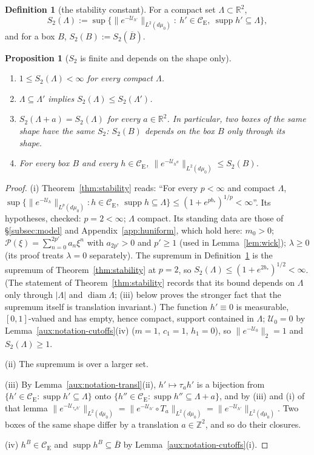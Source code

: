 \documentclass[11pt,a4paper]{article}
\theoremstyle{plain}
\theoremstyle{definition}
\theoremstyle{plain}
\newtheorem{auxprop}[auxlemma]{Proposition}
\theoremstyle{definition}
\newtheorem{auxdef}[auxlemma]{Definition}
\newcommand{\R}{\mathbb{R}}
\newcommand{\Z}{\mathbb{Z}}
\newcommand{\CE}{\mathcal{C}_{\mathrm E}}
\DeclareMathOperator{\supp}{supp}
\newcommand{\Uc}{\mathcal U}
\newcommand{\dmu}{d\mu_0}
\begin{document}
\begin{auxdef}[the stability constant]\label{aux:notation-S2def}
For a compact set $\Lambda\subset\R^2$,
\[
 S_2(\Lambda):=\sup\bigl\{\|e^{-\Uc_{h'}}\|_{L^2(\dmu)}:\ h'\in\CE,\ \supp h'\subseteq\Lambda\bigr\},
\]
and for a box $B$, $S_2(B):=S_2(\overline B)$.
\end{auxdef}

\begin{auxprop}[$S_2$ is finite and depends on the shape only]\label{aux:notation-S2}
\begin{enumerate}
\item[\textup{(i)}] $1\le S_2(\Lambda)<\infty$ for every compact $\Lambda$.
\item[\textup{(ii)}] $\Lambda\subseteq\Lambda'$ implies $S_2(\Lambda)\le S_2(\Lambda')$.
\item[\textup{(iii)}] $S_2(\Lambda+a)=S_2(\Lambda)$ for every $a\in\R^2$.  In particular, two
boxes of the same shape have the same $S_2$: $S_2(B)$ depends on the box $B$ only through its
shape.
\item[\textup{(iv)}] For every box $B$ and every $h\in\CE$,
$\|e^{-\Uc_{h^B}}\|_{L^2(\dmu)}\le S_2(B)$.
\end{enumerate}
\end{auxprop}

\begin{proof}
(i) Theorem~\ref{thm:stability} reads: ``For every $p<\infty$ and compact
$\Lambda$, $\sup\{\|e^{-\mathcal U_h}\|_{L^p(d\mu_0)}:h\in\CE,\ \supp h\subseteq\Lambda\}\le
(1+e^{pb_*})^{1/p}<\infty$''.
Its hypotheses, checked: $p=2<\infty$; $\Lambda$ compact.  Its standing data are those of
\S\ref{subsec:model} and Appendix~\ref{app:huniform}, which hold here: $m_0>0$; $\mathscr
P(\xi)=\sum_{n=0}^{2p'}a_n\xi^n$ with $a_{2p'}>0$ and $p'\ge1$ (used in Lemma~\ref{lem:wick}); $\lambda\ge0$
(its proof treats $\lambda=0$ separately).  The supremum in
Definition~\ref{aux:notation-S2def} is the supremum of Theorem~\ref{thm:stability} at $p=2$, so
$S_2(\Lambda)\le(1+e^{2b_*})^{1/2}<\infty$.  (The statement of Theorem~\ref{thm:stability}
records that its bound depends on $\Lambda$ only through $|\Lambda|$ and
$\operatorname{diam}\Lambda$; (iii) below proves the stronger fact that the supremum itself is
translation invariant.)  The function $h'\equiv0$ is measurable, $[0,1]$-valued and has empty,
hence compact, support contained in $\Lambda$; $\Uc_0=0$ by
Lemma~\ref{aux:notation-cutoffs}(iv) ($m=1$, $c_1=1$, $h_1=0$), so $\|e^{-\Uc_0}\|_2=1$ and
$S_2(\Lambda)\ge1$.

(ii) The supremum is over a larger set.

(iii) By Lemma~\ref{aux:notation-transl}(ii), $h'\mapsto\tau_ah'$ is a bijection from
$\{h'\in\CE:\supp h'\subseteq\Lambda\}$ onto $\{h''\in\CE:\supp h''\subseteq\Lambda+a\}$, and
by (iii) and (i) of that lemma
$\|e^{-\Uc_{\tau_ah'}}\|_{L^2(\dmu)}=\|e^{-\Uc_{h'}}\circ T_a\|_{L^2(\dmu)}=
\|e^{-\Uc_{h'}}\|_{L^2(\dmu)}$.  Two boxes of the same shape differ by a translation
$a\in\Z^2$, and so do their closures.

(iv) $h^B\in\CE$ and $\supp h^B\subseteq\overline B$ by
Lemma~\ref{aux:notation-cutoffs}(i).
\end{proof}
\end{document}
